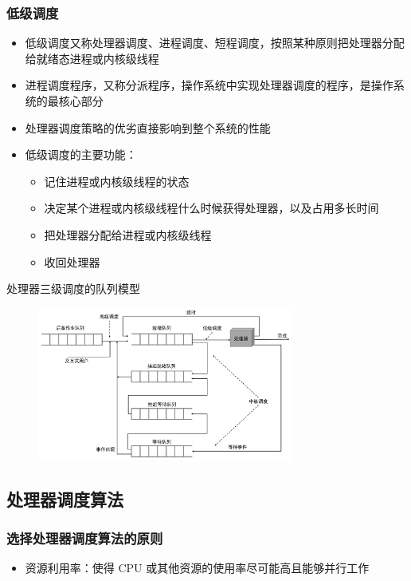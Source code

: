 \documentclass[cs4size,a4paper,10pt]{ctexart}
\begin{document}
	\subsubsection{低级调度}
	\begin{itemize}
		\item 低级调度又称处理器调度、进程调度、短程调度，按照某种原则把处理器分配给就绪态进程或内核级线程
		\item 进程调度程序，又称分派程序，操作系统中实现处理器调度的程序，是操作系统的最核心部分
		\item 处理器调度策略的优劣直接影响到整个系统的性能
		\item 低级调度的主要功能：
		\begin{itemize}
			\item 记住进程或内核级线程的状态
			\item 决定某个进程或内核级线程什么时候获得处理器，以及占用多长时间
			\item 把处理器分配给进程或内核级线程
			\item 收回处理器
		\end{itemize}
	\end{itemize}
	处理器三级调度的队列模型
	\begin{figure}[H]
		\centering
		\includegraphics[width=0.75\textwidth]{img/2.5.1.3}
	\end{figure}

	\subsection{处理器调度算法}
	\subsubsection{选择处理器调度算法的原则}
	\begin{itemize}
		\item 资源利用率：使得 CPU 或其他资源的使用率尽可能高且能够并行工作
	\end{itemize}
\end{document}
